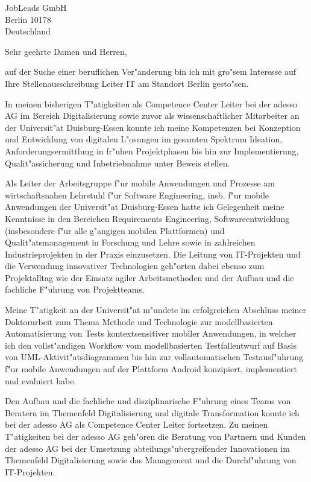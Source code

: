 \documentclass[11pt,a4paper]{dinbrief}
\date{\today}
\begin{document}
 
\begin{letter}  
{%
	JobLeads GmbH\\
	Berlin 10178\\
	Deutschland
}
\subject{\bf Bewerbung Leiter IT}
\opening{Sehr geehrte Damen und Herren,}
auf der Suche einer beruflichen Ver"anderung bin ich mit gro"sem Interesse auf Ihre Stellenausschreibung Leiter IT am Standort Berlin gesto"sen. 

In meinen bisherigen T"atigkeiten als Competence Center Leiter bei der adesso AG im Bereich Digitalisierung sowie zuvor als wissenschaftlicher Mitarbeiter an der Universit"at Duisburg-Essen konnte ich meine Kompetenzen bei Konzeption und Entwicklung von digitalen L"osungen im gesamten Spektrum Ideation, Anforderungsermittlung in fr"uhen Projektphasen bis hin zur Implementierung, Qualit"assicherung und Inbetriebnahme unter Beweis stellen.

Als Leiter der Arbeitsgruppe f"ur mobile Anwendungen und Prozesse am wirtschaftsnahen Lehrstuhl f"ur Software Engineering, insb. f"ur mobile Anwendungen der Universit"at Duisburg-Essen hatte ich Gelegenheit meine Kenntnisse in den Bereichen Requirements Engineering, Softwareentwicklung (insbesondere f"ur alle g"angigen mobilen Plattformen) und Qualit"atsmanagement in Forschung und Lehre sowie in zahlreichen Industrieprojekten in der Praxis einzusetzen. Die Leitung von IT-Projekten und die Verwendung innovativer Technologien geh"orten dabei ebenso zum Projektalltag wie der Einsatz agiler Arbeitsmethoden und der Aufbau und die fachliche  F"uhrung von Projektteams.

Meine T"atigkeit an der Universit"at m"undete im erfolgreichen Abschluss meiner Doktor\-arbeit zum Thema Methode und Technologie zur modellbasierten Automatisierung von Tests kontextsensitiver mobiler Anwendungen, in welcher ich den vollst"andigen Workflow vom modellbasierten Testfallentwurf auf Basis von UML-Aktivit"atsdiagrammen bis hin zur vollautomatischen Testausf"uhrung f"ur mobile Anwendungen auf der Plattform Android konzipiert, implementiert und evaluiert habe.

\clearpage
Den Aufbau und die fachliche und disziplinarische F"uhrung eines Teams von Beratern im Themenfeld Digitalisierung und digitale Transformation konnte ich bei der adesso AG als Competence Center Leiter fortsetzen. Zu meinen T"atigkeiten bei der adesso AG geh"oren die Beratung von Partnern und Kunden der adesso AG bei der Umsetzung abteilungs"ubergreifender Innovationen im Themenfeld Digitalisierung sowie das Management und die Durchf"uhrung von IT-Projekten.


\end{letter}
\end{document}
